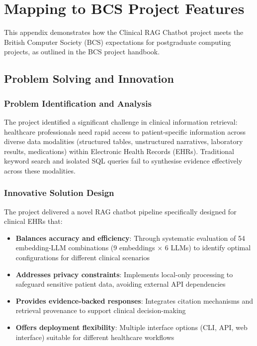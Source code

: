 \chapter{Mapping to BCS Project Features}
\label{appendix:bcs}

This appendix demonstrates how the Clinical RAG Chatbot project meets the British Computer Society (BCS) expectations for postgraduate computing projects, as outlined in the BCS project handbook.

\section{Problem Solving and Innovation}

\subsection{Problem Identification and Analysis}
The project identified a significant challenge in clinical information retrieval: healthcare professionals need rapid access to patient-specific information across diverse data modalities (structured tables, unstructured narratives, laboratory results, medications) within Electronic Health Records (EHRs). Traditional keyword search and isolated SQL queries fail to synthesise evidence effectively across these modalities.

\subsection{Innovative Solution Design}
The project delivered a novel RAG chatbot pipeline specifically designed for clinical EHRs that:
\begin{itemize}
    \item \textbf{Balances accuracy and efficiency}: Through systematic evaluation of 54 embedding-LLM combinations (9 embeddings × 6 LLMs) to identify optimal configurations for different clinical scenarios
    \item \textbf{Addresses privacy constraints}: Implements local-only processing to safeguard sensitive patient data, avoiding external API dependencies
    \item \textbf{Provides evidence-backed responses}: Integrates citation mechanisms and retrieval provenance to support clinical decision-making
    \item \textbf{Offers deployment flexibility}: Multiple interface options (CLI, API, web interface) suitable for different healthcare workflows
\end{itemize}

